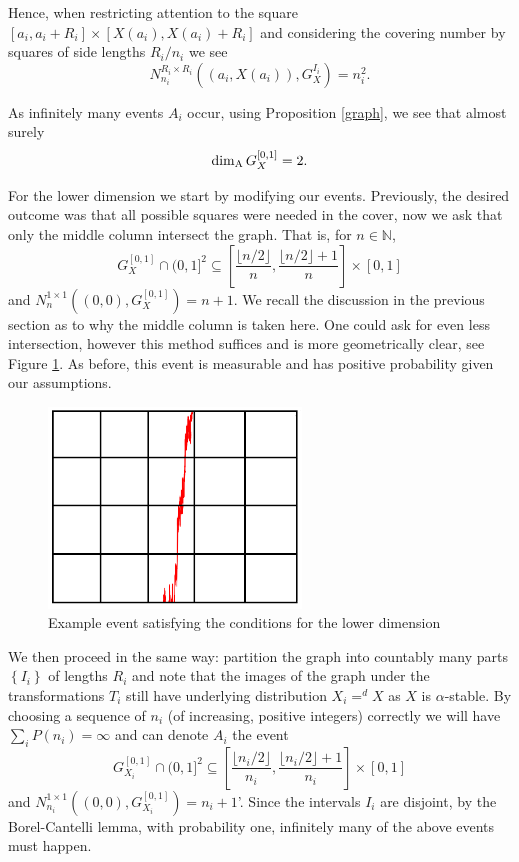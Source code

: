 Hence, when restricting attention to the square $[a_i, a_i + R_i] \times [X(a_i), X(a_i)+R_i]$ and considering the covering number by squares of side lengths $R_i/n_i$ we see
\[
N_{n_i}^{R_i \times R_i }\left((a_i,X(a_i)),G_{X}^{I_i}\right)=n_i^2.
\]

As infinitely many events $A_i$ occur, using Proposition \ref{graph}, we see that almost surely
\[
\dim_{\textup{A}} G_{X}^{[0,1]}=2.
\]


For the lower dimension we start by modifying our events. Previously, the desired outcome was that all possible squares were needed in the cover, now we ask that only the middle column intersect the graph. That is, for $n\in \mathbb{N}$,
$$G_{X}^{[0,1]} \cap (0,1]^2 \subseteq \left[\frac{\lfloor n/2 \rfloor}{n} ,  \frac{\lfloor n/2 \rfloor + 1}{n} \right] \times [0,1]$$
and $N_{n}^{1\times 1}((0,0),G_X^{[0,1]}) = n + 1$. We recall the discussion in the previous section as to why the middle column is taken here. One could ask for even less intersection, however this method suffices and is more geometrically clear, see Figure \ref{fig:rectangles-graph2}. As before, this event is measurable and has positive probability given our assumptions.

\begin{figure}[h]
    \centering
    \includegraphics[width=0.6\textwidth]{pics/ch-brownian/rectangles-graph2.png}
    \caption{Example event satisfying the conditions for the lower dimension}
    \label{fig:rectangles-graph2}
\end{figure}


We then proceed in the same way: partition the graph into countably many parts $\left\{I_i \right\}$ of lengths $R_i$ and note that the images of the graph under the transformations $T_i$ still have underlying distribution $X_i =^d X$ as $X$ is $\alpha$-stable. By choosing a sequence of $n_i$ (of increasing, positive integers) correctly we will have $\sum_{i}P(n_i) = \infty$ and can denote $A_i$ the event 
$$G_{X_i}^{[0,1]} \cap (0,1]^2 \subseteq \left[\frac{\lfloor n_i/2 \rfloor}{n_i} ,  \frac{\lfloor n_i/2 \rfloor + 1}{n_i} \right] \times [0,1]$$
and $N_{n_i}^{1\times 1}((0,0),G_{X_i}^{[0,1]}) = n_i + 1$'. Since the intervals $I_i$ are disjoint, by the Borel-Cantelli lemma, with probability one, infinitely many of the above events must happen.

